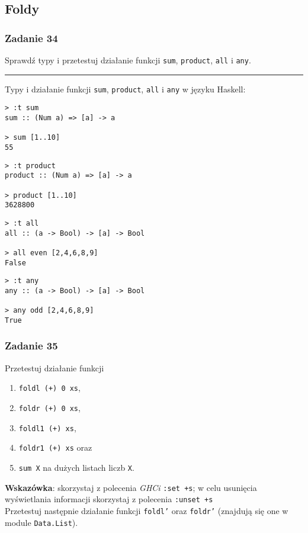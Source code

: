 \documentclass[11pt,a4paper]{article}
\begin{document}
\subsection{Foldy}
\subsubsection{Zadanie 34}
Sprawdź typy i przetestuj działanie funkcji \texttt{sum}, \texttt{product}, \texttt{all} i \texttt{any}.

\bigskip
\hrule
\bigskip

Typy i działanie funkcji \texttt{sum}, \texttt{product}, \texttt{all} i \texttt{any} w języku Haskell:
\begin{Verbatim}[frame=single]
> :t sum
sum :: (Num a) => [a] -> a

> sum [1..10]
55
\end{Verbatim}
\begin{Verbatim}[frame=single]
> :t product
product :: (Num a) => [a] -> a

> product [1..10]
3628800
\end{Verbatim}
\begin{Verbatim}[frame=single]
> :t all
all :: (a -> Bool) -> [a] -> Bool

> all even [2,4,6,8,9]
False
\end{Verbatim}
\begin{Verbatim}[frame=single]
> :t any
any :: (a -> Bool) -> [a] -> Bool

> any odd [2,4,6,8,9]
True
\end{Verbatim}

\subsubsection{Zadanie 35}
Przetestuj działanie funkcji
\begin{enumerate}
    \item \texttt{foldl (+) 0 xs}, 
    \item \texttt{foldr (+) 0 xs}, 
    \item \texttt{foldl1 (+) xs}, 
    \item \texttt{foldr1 (+) xs} oraz 
    \item \texttt{sum X} na dużych listach liczb \texttt{X}.
\end{enumerate}
\textbf{Wskazówka}: skorzystaj z polecenia \textit{GHCi} \texttt{:set +s}; w celu usunięcia wyświetlania informacji skorzystaj z polecenia \texttt{:unset +s} \\
Przetestuj następnie działanie funkcji \texttt{foldl’} oraz \texttt{foldr’} (znajdują się one w module \texttt{Data.List}).
\end{document}

